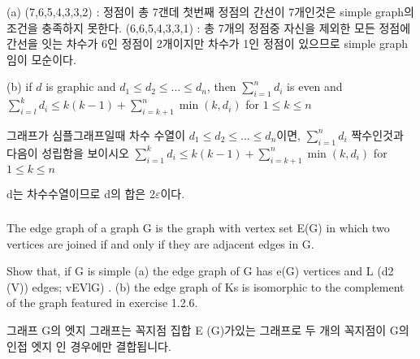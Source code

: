 \documentclass{oblivoir}
\begin{document}
(a) (7,6,5,4,3,3,2) : 정점이 총 7갠데 첫번째 정점의 간선이 7개인것은 simple graph의 조건을 충족하지 못한다.
(6,6,5,4,3,3,1) : 총 7개의 정점중 자신을 제외한 모든 정점에 간선을 잇는 차수가 6인 정점이 2개이지만 차수가 1인 정점이 있으므로  simple graph임이 모순이다.

(b) if $d$ is graphic and $d_1 \le d_2 \le ... \le d_n$, then $\sum_{i=1}^{n} d_i$ is even and $\sum_{i=l}^{k} d_i \le k(k -1)+\sum_{i=k+1}^{n}\min(k, d_i)$ for $1 \le k \le n$

그래프가 심플그래프일때 차수 수열이 $d_1 \le d_2 \le ... \le d_n$이면,  $\sum_{i=1}^{n} d_i$ 짝수인것과 다음이 성립함을 보이시오
$\sum_{i=1}^{k} d_i \le k(k -1)+\sum_{i=k+1}^{n}\min(k, d_i)$ for $1 \le k \le n$

d는 차수수열이므로 d의 합은 $2\varepsilon$이다.
\subsubsection{} 
%
\subsubsection{} 
%
\subsubsection{} 
%
\subsubsection{} 

The edge graph of a graph G is the graph with vertex set E(G) in
which two vertices are joined if and only if they are adjacent edges in G. 

Show that, if G is simple
(a) the edge graph of G has e(G) vertices and L (d2 (V)) edges; vEVlG) .
(b) the edge graph of Ks is isomorphic to the complement of the graph featured in exercise 1.2.6.

그래프 G의 엣지 그래프는 꼭지점 집합 E (G)가있는 그래프로 두 개의 꼭지점이 G의 인접 엣지 인 경우에만 결합됩니다.
\end{document}
